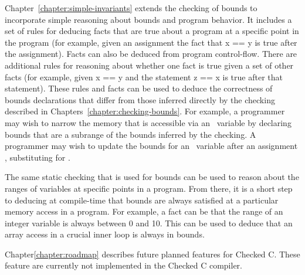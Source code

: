 Chapter~\ref{chapter:simple-invariants}
extends the checking of bounds to incorporate simple
reasoning about bounds and program behavior. It includes a set of rules
for deducing facts that are true about a program at a specific point in
the program (for example, given an assignment  the fact
that x == y is true after the assignment). Facts can also be deduced
from program control-flow. There are additional rules for reasoning
about whether one fact is true given a set of other facts (for example,
given x == y and the statement  z == x is true after that
statement). These rules and facts can be used to deduce the correctness
of bounds declarations that differ from those inferred directly by the
checking described in Chapters~\ref{chapter:checking-bounds}. For example,
a programmer may wish to narrow the memory that is accessible via an
\arrayptr\ variable by declaring bounds that are a subrange of
the bounds inferred by the checking. A programmer may wish to update the
bounds for an \arrayptr\ variable after an assignment , substituting
 for .

The same static checking that is used for bounds can be used to reason
about the ranges of variables at specific points in a program. From
there, it is a short step to deducing at compile-time that bounds are
always satisfied at a particular memory access in a program. For
example, a fact can be that the range of an integer variable 
is always between 0 and 10. This can be used to deduce that an array
access in a crucial inner loop is always in bounds.

Chapter\ref{chapter:roadmap} describes future planned features for Checked C.
These feature are currently not implemented in the Checked C compiler.


